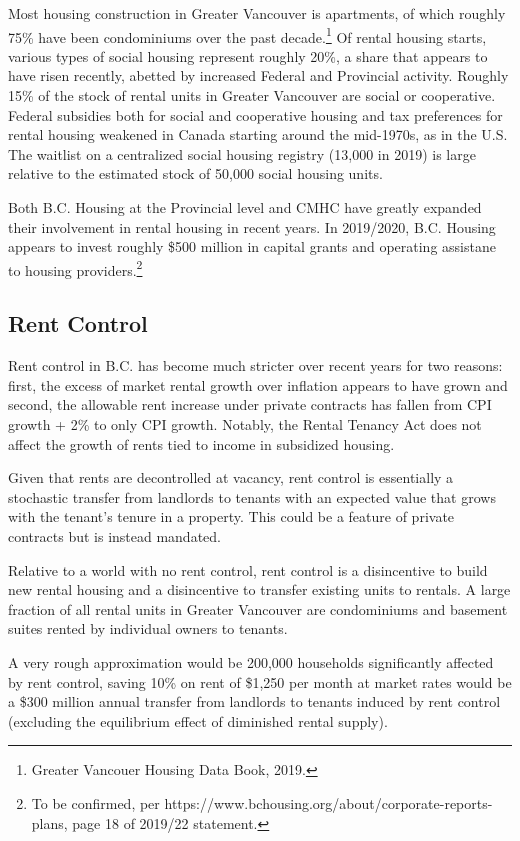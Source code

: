 \documentclass[12pt]{article}
\begin{document}
Most housing construction in Greater Vancouver is apartments, of which roughly 75\% have been condominiums over the past decade.\footnote{Greater Vancouer Housing Data Book, 2019.} Of rental housing starts, various types of social housing represent roughly 20\%, a share that appears to have risen recently, abetted by increased Federal and Provincial activity. Roughly 15\% of the stock of rental units in Greater Vancouver are social or cooperative. Federal subsidies both for social and cooperative housing and tax preferences for rental housing weakened in Canada starting around the mid-1970s, as in the U.S. The waitlist on a centralized social housing registry (13,000 in 2019) is large relative to the estimated stock of 50,000 social housing units.

Both B.C. Housing at the Provincial level and CMHC have greatly expanded their involvement in rental housing in recent years. In 2019/2020, B.C. Housing appears to invest roughly \$500 million in capital grants and operating assistane to housing providers.\footnote{To be confirmed, per https://www.bchousing.org/about/corporate-reports-plans, page 18 of 2019/22 statement.}

\subsection{Rent Control}

Rent control in B.C. has become much stricter over recent years for two reasons: first, the excess of market rental growth over inflation appears to have grown and second, the allowable rent increase under private contracts has fallen from CPI growth + 2\% to only CPI growth. Notably, the Rental Tenancy Act does not affect the growth of rents tied to income in subsidized housing.

Given that rents are decontrolled at vacancy, rent control is essentially a stochastic transfer from landlords to tenants with an expected value that grows with the tenant's tenure in a property. This could be a feature of private contracts but is instead mandated. 

Relative to a world with no rent control, rent control is a disincentive to build new rental housing and a disincentive to transfer existing units to rentals. A large fraction of all rental units in Greater Vancouver are condominiums and basement suites rented by individual owners to tenants. 

A very rough approximation would be 200,000 households significantly affected by rent control, saving 10\% on rent of \$1,250 per month at market rates would be a \$300 million annual transfer from landlords to tenants induced by rent control (excluding the equilibrium effect of diminished rental supply). 
\end{document}
